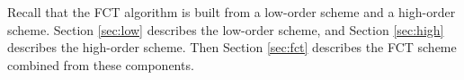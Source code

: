 Recall that the FCT algorithm is built from a low-order scheme and a high-order
scheme. Section \ref{sec:low} describes the low-order scheme, and Section
\ref{sec:high} describes the high-order scheme. Then Section \ref{sec:fct}
describes the FCT scheme combined from these components.
